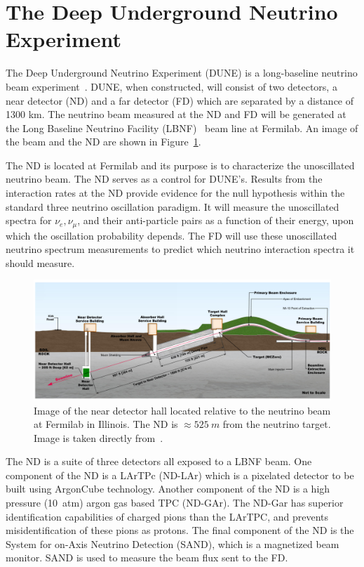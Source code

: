\section{The Deep Underground Neutrino Experiment}
\label{sec:dune}
The Deep Underground Neutrino Experiment (DUNE) is a long-baseline neutrino beam experiment~\citep{DUNE_TDR_V1_Abi_2020, DUNE_FD_TDRv2_2020, DUNE_TDRv3_Abi_2020, DUNE-FD_TDRv4:Abi_2020}.
DUNE, when constructed, will consist of two detectors, a near detector (ND) and a far detector (FD) which are separated by a distance of 1300 km.
The neutrino beam measured at the ND and FD will be generated at the Long Baseline Neutrino Facility (LBNF)~\citep{dune_cdr_2016_arxiv} beam line at Fermilab.
An image of the beam and the ND are shown in Figure~\ref{fig:dune_nd_beamline}.

The ND is located at Fermilab and its purpose is to characterize the unoscillated neutrino beam.
The ND serves as a control for DUNE's.
Results from the interaction rates at the ND provide evidence for the null hypothesis within the standard three neutrino oscillation paradigm.
It will measure the unoscillated spectra for $\nu_{e}, \nu_{\mu}$, and their anti-particle pairs as a function of their energy, upon which the oscillation probability depends.
The FD will use these unoscillated neutrino spectrum measurements to predict which neutrino interaction spectra it should measure.

\begin{figure}[]
\centering
\includegraphics[width=\textwidth]{images/dune_nd_beamline_tdrv1.png}
\caption{Image of the near detector hall located relative to the neutrino beam at Fermilab in Illinois.
The ND is $\approx 525~\unit{m}$ from the neutrino target.
Image is taken directly from~\citep{DUNE_TDR_V1_Abi_2020}.
}
\label{fig:dune_nd_beamline}
\end{figure}

The ND is a suite of three detectors all exposed to a LBNF beam.
One component of the ND is a LArTPc (ND-LAr) which is a pixelated detector to be built using ArgonCube technology.
Another component of the ND is a high pressure (10~\unit{atm}) argon gas based TPC (ND-GAr).
The ND-Gar has superior identification capabilities of charged pions than the LArTPC, and prevents misidentification of these pions as protons.
The final component of the ND is the System for on-Axis Neutrino Detection (SAND), which is a magnetized beam monitor.
SAND is used to measure the beam flux sent to the FD.

